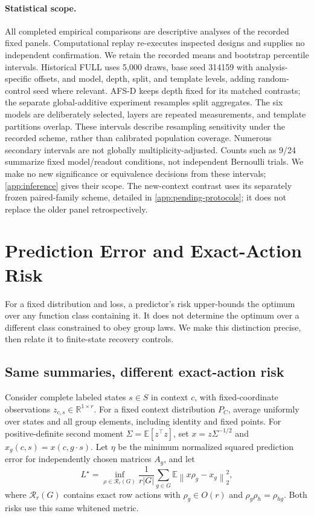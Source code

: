 \documentclass[10pt]{article}
\newcommand{\R}{\mathbb{R}}
\newcommand{\norm}[1]{\left\lVert #1\right\rVert}
\begin{document}
\paragraph{Statistical scope.}
All completed empirical comparisons are descriptive analyses of the recorded fixed panels. Computational replay re-executes inspected designs and supplies no independent confirmation. We retain the recorded means and bootstrap percentile intervals. Historical FULL uses 5,000 draws, base seed 314159 with analysis-specific offsets, and model, depth, split, and template levels, adding random-control seed where relevant. AFS-D keeps depth fixed for its matched contrasts; the separate global-additive experiment resamples split aggregates. The six models are deliberately selected, layers are repeated measurements, and template partitions overlap. These intervals describe resampling sensitivity under the recorded scheme, rather than calibrated population coverage. Numerous secondary intervals are not globally multiplicity-adjusted. Counts such as 9/24 summarize fixed model/readout conditions, not independent Bernoulli trials. We make no new significance or equivalence decisions from these intervals; \cref{app:inference} gives their scope. The new-context contrast uses its separately frozen paired-family scheme, detailed in \cref{app:pending-protocols}; it does not replace the older panel retrospectively.

\section{Prediction Error and Exact-Action Risk}
\label{sec:boundaries}
For a fixed distribution and loss, a predictor's risk upper-bounds the optimum over any function class containing it. It does not determine the optimum over a different class constrained to obey group laws. We make this distinction precise, then relate it to finite-state recovery controls.

\subsection{Same summaries, different exact-action risk}
Consider complete labeled states $s\in S$ in context $c$, with fixed-coordinate observations $z_{c,s}\in\R^{1\times r}$. For a fixed context distribution $P_C$, average uniformly over states and all group elements, including identity and fixed points. For positive-definite second moment $\Sigma=\mathbb E[z^\top z]$, set $x=z\Sigma^{-1/2}$ and $x_g(c,s)=x(c,g\cdot s)$. Let $\eta$ be the minimum normalized squared prediction error for independently chosen matrices $A_g$, and let
\[
 L^\star=\inf_{\rho\in\mathcal R_r(G)}
 \frac1{r|G|}\sum_{g\in G}\mathbb E\norm{x\rho_g-x_g}_2^2,
\]
where $\mathcal R_r(G)$ contains exact row actions with $\rho_g\in O(r)$ and $\rho_g\rho_h=\rho_{hg}$. Both risks use this same whitened metric.
\end{document}
